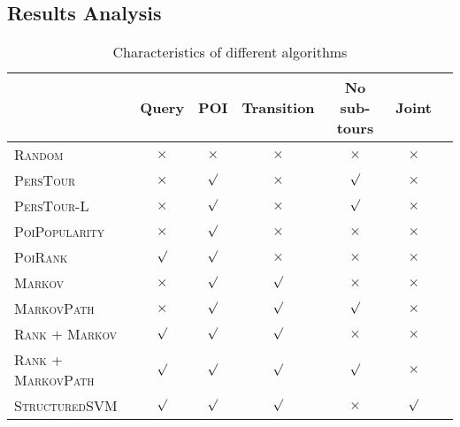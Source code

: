 
\subsection{Results Analysis}
\begin{table*}
\centering
\begin{tabular}{l|cccccc} \hline
                                    & Query    & POI      & Transition & No sub-tours & Joint    \\ \hline
\textsc{Random}                     & $\times$ & $\times$ & $\times$   & $\times$     & $\times$ \\ 
\textsc{PersTour}\cite{ijcai15}     & $\times$ & $\surd$  & $\times$   & $\surd$      & $\times$ \\
\textsc{PersTour-L}                 & $\times$ & $\surd$  & $\times$   & $\surd$      & $\times$ \\
\textsc{PoiPopularity}              & $\times$ & $\surd$  & $\times$   & $\times$     & $\times$ \\ 
\textsc{PoiRank}                    & $\surd$  & $\surd$  & $\times$   & $\times$     & $\times$ \\
\textsc{Markov}                     & $\times$ & $\surd$  & $\surd$    & $\times$     & $\times$ \\
\textsc{MarkovPath}                 & $\times$ & $\surd$  & $\surd$    & $\surd$      & $\times$ \\
\textsc{Rank} + \textsc{Markov}     & $\surd$  & $\surd$  & $\surd$    & $\times$     & $\times$ \\
\textsc{Rank} + \textsc{MarkovPath} & $\surd$  & $\surd$  & $\surd$    & $\surd$      & $\times$ \\
\textsc{StructuredSVM}              & $\surd$  & $\surd$  & $\surd$    & $\times$     & $\surd$  \\ \hline
\end{tabular}
\caption{Characteristics of different algorithms}
\label{table:character}
\end{table*}
